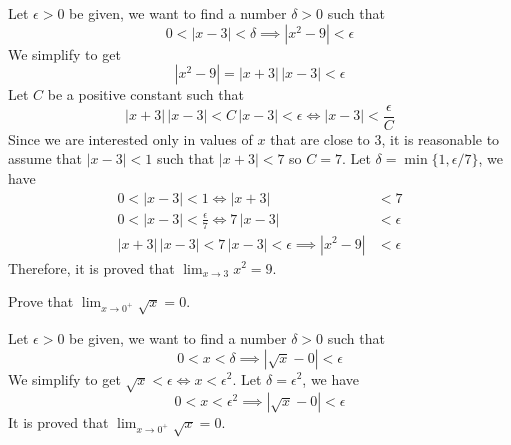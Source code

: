 \begin{solution}
    Let \(\epsilon>0\) be given, we want to find a number \(\delta>0\) such
    that \[0<|x-3|<\delta \implies |x^2-9|<\epsilon\]
    We simplify to get \[|x^2-9|=|x+3|\,|x-3|<\epsilon\]
    Let \(C\) be a positive constant such that
    \[|x+3|\,|x-3|<C\,|x-3|<\epsilon \iff |x-3|<\frac{\epsilon}{C}\]
    Since we are interested only in values of \(x\) that are close to 3, it is
    reasonable to assume that \(|x-3|<1\) such that \(|x+3|<7\) so \(C=7\).
    Let \(\delta=\min\{1,\epsilon/7\}\), we have
    \begin{align*}
        0<|x-3|<1 \iff |x+3|&<7 \\
        0<|x-3|<\frac{\epsilon}{7} \iff 7\,|x-3|&<\epsilon \\
        |x+3|\,|x-3|<7\,|x-3|<\epsilon \implies |x^2-9|&<\epsilon
    \end{align*}
    Therefore, it is proved that \(\displaystyle{\lim_{x\to 3}x^2=9}\).
\end{solution}
\begin{problem}
    Prove that \(\displaystyle{\lim_{x\to 0^+}\sqrt{x}=0}\).
\end{problem}
\begin{solution}
    Let \(\epsilon>0\) be given, we want to find a number \(\delta>0\) such
    that \[0<x<\delta\implies|\sqrt{x}-0|<\epsilon\]
    We simplify to get \(\sqrt{x}<\epsilon\iff x<\epsilon^2\).
    Let \(\delta=\epsilon^2\), we have
    \[0<x<\epsilon^2\implies|\sqrt{x}-0|<\epsilon\]
    It is proved that \(\displaystyle{\lim_{x\to 0^+}\sqrt{x}=0}\).
\end{solution}